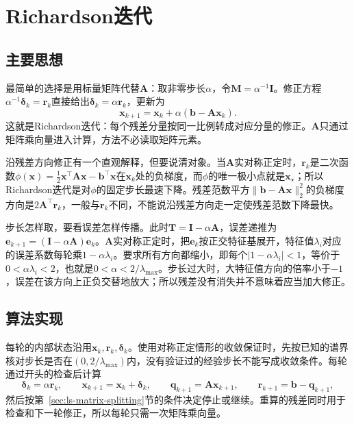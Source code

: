 \section{Richardson迭代}
\label{sec:ls-richardson}

\subsection{主要思想}

最简单的选择是用标量矩阵代替$\bm A$：取非零步长$\alpha$，令$\bm M=\alpha^{-1}\bm I$。修正方程$\alpha^{-1}\bm\delta_k=\bm r_k$直接给出$\bm\delta_k=\alpha\bm r_k$，更新为
\[
\bm x_{k+1}=\bm x_k+\alpha(\bm b-\bm A\bm x_k).
\]
这就是Richardson迭代：每个残差分量按同一比例转成对应分量的修正。$\bm A$只通过矩阵乘向量进入计算，方法不必读取矩阵元素。

沿残差方向修正有一个直观解释，但要说清对象。当$\bm A$实对称正定时，$\bm r_k$是二次函数$\phi(\bm x)=\tfrac12\bm x^\top\bm A\bm x-\bm b^\top\bm x$在$\bm x_k$处的负梯度，而$\phi$的唯一极小点就是$\bm x_\star$；所以Richardson迭代是对$\phi$的固定步长最速下降。残差范数平方$\lVert\bm b-\bm A\bm x\rVert_2^2$的负梯度方向是$2\bm A^\top\bm r_k$，一般与$\bm r_k$不同，不能说沿残差方向走一定使残差范数下降最快。

步长怎样取，要看误差怎样传播。此时$\bm T=\bm I-\alpha\bm A$，误差递推为$\bm e_{k+1}=(\bm I-\alpha\bm A)\bm e_k$。$\bm A$实对称正定时，把$\bm e_k$按正交特征基展开，特征值$\lambda_i$对应的误差系数每轮乘$1-\alpha\lambda_i$。要求所有方向都缩小，即每个$|1-\alpha\lambda_i|<1$，等价于$0<\alpha\lambda_i<2$，也就是$0<\alpha<2/\lambda_{\max}$。步长过大时，大特征值方向的倍率小于$-1$，误差在该方向上正负交替地放大；所以残差没有消失并不意味着应当加大修正。

\subsection{算法实现}

每轮的内部状态沿用$\bm x_k,\bm r_k,\bm\delta_k$。使用对称正定情形的收敛保证时，先按已知的谱界核对步长是否在$(0,2/\lambda_{\max})$内，没有验证过的经验步长不能写成收敛条件。每轮通过开头的检查后计算
\[
\bm\delta_k=\alpha\bm r_k,\qquad
\bm x_{k+1}=\bm x_k+\bm\delta_k,\qquad
\bm q_{k+1}=\bm A\bm x_{k+1},\qquad
\bm r_{k+1}=\bm b-\bm q_{k+1},
\]
然后按第~\ref{sec:ls-matrix-splitting}节的条件决定停止或继续。重算的残差同时用于检查和下一轮修正，所以每轮只需一次矩阵乘向量。

